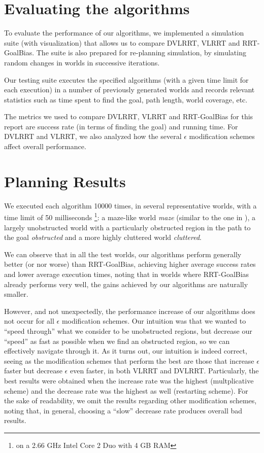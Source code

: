 \documentclass[10pt,twoside,twocolumn]{article}
\begin{document}
\section{Evaluating the algorithms}

To evaluate the performance of our algorithms, we implemented a simulation suite (with visualization) that allows
us to compare DVLRRT, VLRRT and RRT-GoalBias. The suite is also prepared for re-planning simulation, by simulating
random changes in worlds in successive iterations.

Our testing suite executes the specified algorithms (with a given time limit for each execution) in a number of previously
generated worlds and records relevant statistics such as time spent to find the goal, path length, world coverage, etc.

The metrics we used to compare DVLRRT, VLRRT and RRT-GoalBias for this report are success rate (in terms of finding the goal) and running
time. For DVLRRT and VLRRT, we also analyzed how the several $\epsilon$ modification schemes affect overall performance.

\section{Planning Results}

We executed each algorithm 10000 times, in several representative
worlds, with a time limit of 50 milliseconds \footnote{on a 2.66 GHz Intel Core 2 Duo with
  4 GB RAM}: 
a maze-like world \emph{maze} (similar to the one in
\cite{Bruce02real-timerandomized}), a largely unobstructed world with
a particularly obstructed region 
in the path to the goal \emph{obstructed} and a more highly cluttered world \emph{cluttered}.

We can observe that in all the test worlds, our algorithms perform
generally better (or nor worse) than RRT-GoalBias,
achieving higher average success rates and lower average execution
times, noting that in worlds where RRT-GoalBias already performs
very well, the gains achieved by our algorithms are naturally smaller.

However, and not unexpectedly, the performance increase of our algorithms does not occur for all
$\epsilon$ modification schemes.
Our intuition was that we wanted to ``speed through'' what we consider to be unobstructed regions, but decrease our
``speed'' as fast as possible when we find an obstructed region, so we can effectively navigate through it. As it turns
out, our intuition is indeed correct, seeing as the modification schemes that perform the best are those that
increase $\epsilon$ faster but decrease $\epsilon$ even faster, in both VLRRT and DVLRRT. Particularly, the best
results were obtained when the increase rate was the highest (multplicative scheme) and the decrease rate was the 
highest as well (restarting scheme). For the sake of readability, we
omit the results regarding other modification schemes, noting that, in
general, choosing a ``slow'' decrease rate produces overall bad
results.
\end{document}
